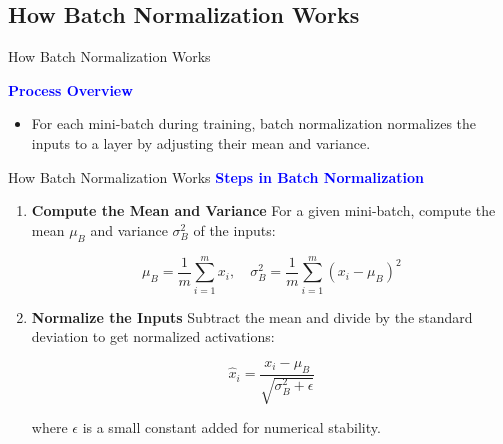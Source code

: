 \documentclass[serif, aspectratio=169]{beamer}
\begin{document}
\subsection{How Batch Normalization Works}

\begin{frame}{How Batch Normalization Works}

    \textcolor{blue}{\textbf{Process Overview}}
    
    \begin{itemize}

        \item  For each mini-batch during training, batch normalization normalizes the inputs to a layer by adjusting their mean and variance.

    \end{itemize}
\end{frame}

\begin{frame}{How Batch Normalization Works}
    \textcolor{blue}{\textbf{Steps in Batch Normalization}}
    
    \begin{enumerate}[<+-| alert@+>] %
        \item \textbf{Compute the Mean and Variance} 
              \newline
              For a given mini-batch, compute the mean $\mu_B$ and variance $\sigma_B^2$ of the inputs:
    
              \[
               \mu_B = \frac{1}{m} \sum_{i=1}^{m} x_i, \quad \sigma_B^2 = \frac{1}{m} \sum_{i=1}^{m} (x_i - \mu_B)^2
              \]
        \item \textbf{Normalize the Inputs}
        \newline
        Subtract the mean and divide by the standard deviation to get normalized activations:

        \[
        \hat{x}_i = \frac{x_i - \mu_B}{\sqrt{\sigma_B^2 + \epsilon}}
        \]

        where $\epsilon$ is a small constant added for numerical stability.
    \end{enumerate}
\end{frame}
\end{document}
